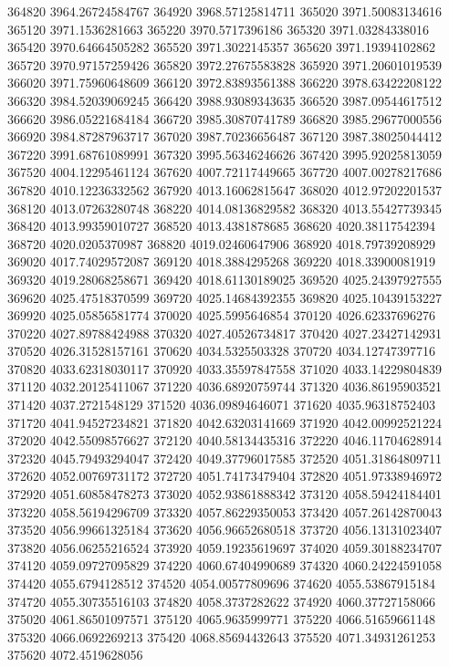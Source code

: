 {364820 3964.26724584767
364920 3968.57125814711
365020 3971.50083134616
365120 3971.1536281663
365220 3970.5717396186
365320 3971.03284338016
365420 3970.64664505282
365520 3971.3022145357
365620 3971.19394102862
365720 3970.97157259426
365820 3972.27675583828
365920 3971.20601019539
366020 3971.75960648609
366120 3972.83893561388
366220 3978.63422208122
366320 3984.52039069245
366420 3988.93089343635
366520 3987.09544617512
366620 3986.05221684184
366720 3985.30870741789
366820 3985.29677000556
366920 3984.87287963717
367020 3987.70236656487
367120 3987.38025044412
367220 3991.68761089991
367320 3995.56346246626
367420 3995.92025813059
367520 4004.12295461124
367620 4007.72117449665
367720 4007.00278217686
367820 4010.12236332562
367920 4013.16062815647
368020 4012.97202201537
368120 4013.07263280748
368220 4014.08136829582
368320 4013.55427739345
368420 4013.99359010727
368520 4013.4381878685
368620 4020.38117542394
368720 4020.0205370987
368820 4019.02460647906
368920 4018.79739208929
369020 4017.74029572087
369120 4018.3884295268
369220 4018.33900081919
369320 4019.28068258671
369420 4018.61130189025
369520 4025.24397927555
369620 4025.47518370599
369720 4025.14684392355
369820 4025.10439153227
369920 4025.05856581774
370020 4025.5995646854
370120 4026.62337696276
370220 4027.89788424988
370320 4027.40526734817
370420 4027.23427142931
370520 4026.31528157161
370620 4034.5325503328
370720 4034.12747397716
370820 4033.62318030117
370920 4033.35597847558
371020 4033.14229804839
371120 4032.20125411067
371220 4036.68920759744
371320 4036.86195903521
371420 4037.2721548129
371520 4036.09894646071
371620 4035.96318752403
371720 4041.94527234821
371820 4042.63203141669
371920 4042.00992521224
372020 4042.55098576627
372120 4040.58134435316
372220 4046.11704628914
372320 4045.79493294047
372420 4049.37796017585
372520 4051.31864809711
372620 4052.00769731172
372720 4051.74173479404
372820 4051.97338946972
372920 4051.60858478273
373020 4052.93861888342
373120 4058.59424184401
373220 4058.56194296709
373320 4057.86229350053
373420 4057.26142870043
373520 4056.99661325184
373620 4056.96652680518
373720 4056.13131023407
373820 4056.06255216524
373920 4059.19235619697
374020 4059.30188234707
374120 4059.09727095829
374220 4060.67404990689
374320 4060.24224591058
374420 4055.6794128512
374520 4054.00577809696
374620 4055.53867915184
374720 4055.30735516103
374820 4058.3737282622
374920 4060.37727158066
375020 4061.86501097571
375120 4065.9635999771
375220 4066.51659661148
375320 4066.0692269213
375420 4068.85694432643
375520 4071.34931261253
375620 4072.4519628056
}
